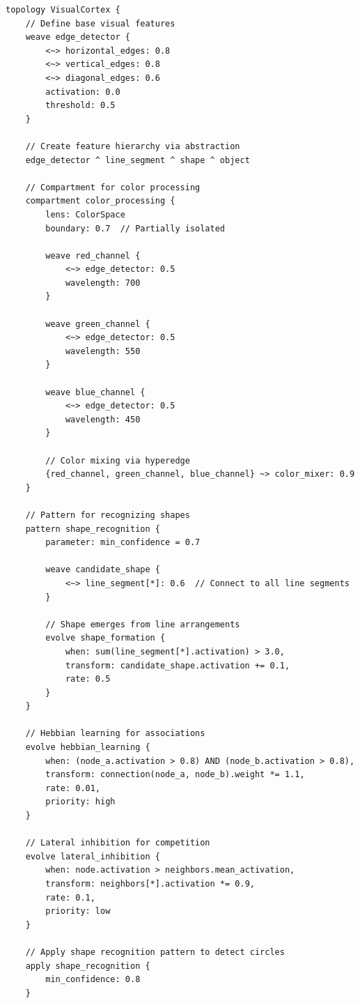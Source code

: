 \documentclass[12pt,a4paper,openany]{book} %
\begin{document}
\vspace{0.5em}
\begin{lstlisting}[language=loom]
topology VisualCortex {
    // Define base visual features
    weave edge_detector {
        <~> horizontal_edges: 0.8
        <~> vertical_edges: 0.8
        <~> diagonal_edges: 0.6
        activation: 0.0
        threshold: 0.5
    }

    // Create feature hierarchy via abstraction
    edge_detector ^ line_segment ^ shape ^ object

    // Compartment for color processing
    compartment color_processing {
        lens: ColorSpace
        boundary: 0.7  // Partially isolated

        weave red_channel {
            <~> edge_detector: 0.5
            wavelength: 700
        }

        weave green_channel {
            <~> edge_detector: 0.5
            wavelength: 550
        }

        weave blue_channel {
            <~> edge_detector: 0.5
            wavelength: 450
        }

        // Color mixing via hyperedge
        {red_channel, green_channel, blue_channel} ~> color_mixer: 0.9
    }

    // Pattern for recognizing shapes
    pattern shape_recognition {
        parameter: min_confidence = 0.7

        weave candidate_shape {
            <~> line_segment[*]: 0.6  // Connect to all line segments
        }

        // Shape emerges from line arrangements
        evolve shape_formation {
            when: sum(line_segment[*].activation) > 3.0,
            transform: candidate_shape.activation += 0.1,
            rate: 0.5
        }
    }

    // Hebbian learning for associations
    evolve hebbian_learning {
        when: (node_a.activation > 0.8) AND (node_b.activation > 0.8),
        transform: connection(node_a, node_b).weight *= 1.1,
        rate: 0.01,
        priority: high
    }

    // Lateral inhibition for competition
    evolve lateral_inhibition {
        when: node.activation > neighbors.mean_activation,
        transform: neighbors[*].activation *= 0.9,
        rate: 0.1,
        priority: low
    }

    // Apply shape recognition pattern to detect circles
    apply shape_recognition {
        min_confidence: 0.8
    }


\end{lstlisting}
\end{document}
